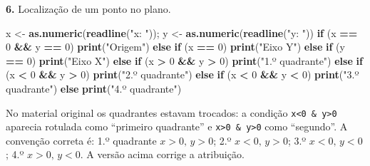 \documentclass[
  portuguese,
  11pt,
  openany]{book}
\newenvironment{Shaded}{\begin{snugshade}}{\end{snugshade}}
\newcommand{\ControlFlowTok}[1]{\textcolor[rgb]{0.13,0.29,0.53}{\textbf{#1}}}
\newcommand{\DecValTok}[1]{\textcolor[rgb]{0.00,0.00,0.81}{#1}}
\newcommand{\FunctionTok}[1]{\textcolor[rgb]{0.13,0.29,0.53}{\textbf{#1}}}
\newcommand{\NormalTok}[1]{#1}
\newcommand{\OtherTok}[1]{\textcolor[rgb]{0.56,0.35,0.01}{#1}}
\newcommand{\SpecialCharTok}[1]{\textcolor[rgb]{0.81,0.36,0.00}{\textbf{#1}}}
\newcommand{\StringTok}[1]{\textcolor[rgb]{0.31,0.60,0.02}{#1}}
\begin{document}
\textbf{6.} Localização de um ponto no plano.

\begin{Shaded}
\begin{Highlighting}[]
\NormalTok{x }\OtherTok{\textless{}{-}} \FunctionTok{as.numeric}\NormalTok{(}\FunctionTok{readline}\NormalTok{(}\StringTok{"x: "}\NormalTok{)); y }\OtherTok{\textless{}{-}} \FunctionTok{as.numeric}\NormalTok{(}\FunctionTok{readline}\NormalTok{(}\StringTok{"y: "}\NormalTok{))}
\ControlFlowTok{if}\NormalTok{ (x }\SpecialCharTok{==} \DecValTok{0} \SpecialCharTok{\&\&}\NormalTok{ y }\SpecialCharTok{==} \DecValTok{0}\NormalTok{)      }\FunctionTok{print}\NormalTok{(}\StringTok{"Origem"}\NormalTok{)            }\ControlFlowTok{else}
\ControlFlowTok{if}\NormalTok{ (x }\SpecialCharTok{==} \DecValTok{0}\NormalTok{)                }\FunctionTok{print}\NormalTok{(}\StringTok{"Eixo Y"}\NormalTok{)            }\ControlFlowTok{else}
\ControlFlowTok{if}\NormalTok{ (y }\SpecialCharTok{==} \DecValTok{0}\NormalTok{)                }\FunctionTok{print}\NormalTok{(}\StringTok{"Eixo X"}\NormalTok{)            }\ControlFlowTok{else}
\ControlFlowTok{if}\NormalTok{ (x }\SpecialCharTok{\textgreater{}} \DecValTok{0} \SpecialCharTok{\&\&}\NormalTok{ y }\SpecialCharTok{\textgreater{}} \DecValTok{0}\NormalTok{)        }\FunctionTok{print}\NormalTok{(}\StringTok{"1.º quadrante"}\NormalTok{)     }\ControlFlowTok{else}
\ControlFlowTok{if}\NormalTok{ (x }\SpecialCharTok{\textless{}} \DecValTok{0} \SpecialCharTok{\&\&}\NormalTok{ y }\SpecialCharTok{\textgreater{}} \DecValTok{0}\NormalTok{)        }\FunctionTok{print}\NormalTok{(}\StringTok{"2.º quadrante"}\NormalTok{)     }\ControlFlowTok{else}
\ControlFlowTok{if}\NormalTok{ (x }\SpecialCharTok{\textless{}} \DecValTok{0} \SpecialCharTok{\&\&}\NormalTok{ y }\SpecialCharTok{\textless{}} \DecValTok{0}\NormalTok{)        }\FunctionTok{print}\NormalTok{(}\StringTok{"3.º quadrante"}\NormalTok{)     }\ControlFlowTok{else}
                           \FunctionTok{print}\NormalTok{(}\StringTok{"4.º quadrante"}\NormalTok{)}
\end{Highlighting}
\end{Shaded}

No material original os quadrantes estavam trocados: a condição \texttt{x\textless{}0\ \&\ y\textgreater{}0}
aparecia rotulada como ``primeiro quadrante'' e \texttt{x\textgreater{}0\ \&\ y\textgreater{}0} como ``segundo''. A
convenção correta é: 1.º quadrante \(x>0,\,y>0\); 2.º \(x<0,\,y>0\); 3.º
\(x<0,\,y<0\); 4.º \(x>0,\,y<0\). A versão acima corrige a atribuição.
\end{document}
